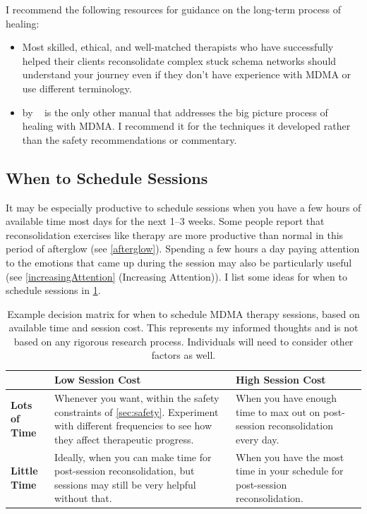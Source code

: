 \documentclass[11pt,oneside]{book}
\let\cite\parencite
\newcommand{\prosecite}[1]{\citetitle{#1} by \citefullauthor{#1}~\cite{#1}}
\begin{document}
I recommend the following resources for guidance on the long-term process of healing:
\begin{itemize}
    \item Most skilled, ethical, and well-matched therapists who have successfully helped their clients reconsolidate complex stuck schema networks should understand your journey even if they don't have experience with MDMA or use different terminology.
    \item \prosecite{kaspianSolo} is the only other manual that addresses the big picture process of healing with MDMA. I recommend it for the techniques it developed rather than the safety recommendations or commentary.
\end{itemize}

\subsection*{When to Schedule Sessions}
\FloatBarrier
It may be especially productive to schedule sessions when you have a few hours of available time most days for the next 1--3 weeks. Some people report that reconsolidation exercises like therapy are more productive than normal in this period of afterglow (see \cref{afterglow}). Spending a few hours a day paying attention to the emotions that came up during the session may also be particularly useful (see \cref{increasingAttention} (Increasing Attention)). I list some ideas for when to schedule sessions in \cref{sessionDecision}.

\begin{table}[htbp]
\caption{Example decision matrix for when to schedule MDMA therapy sessions, based on available time and session cost. This represents my informed thoughts and is not based on any rigorous research process. Individuals will need to consider other factors as well.}
\label{sessionDecision}
\centering
\begin{tabular}{|p{2.7cm}|p{6.15cm}|p{6.15cm}|}
    \hline
    & \centering\textbf{Low Session Cost} & \centering\textbf{High Session Cost} \tabularnewline
    \hline
    \centering\textbf{Lots of Time} &
    \centering Whenever you want, within the safety constraints of \cref{sec:safety}. Experiment with different frequencies to see how they affect therapeutic progress. &
    \centering When you have enough time to max out on post-session reconsolidation every day. \tabularnewline
    \hline
    \centering\textbf{Little Time} &
    \centering Ideally, when you can make time for post-session reconsolidation, but sessions may still be very helpful without that. &
    \centering When you have the most time in your schedule for post-session reconsolidation. \tabularnewline
    \hline
\end{tabular}
\end{table}
\FloatBarrier
\end{document}
